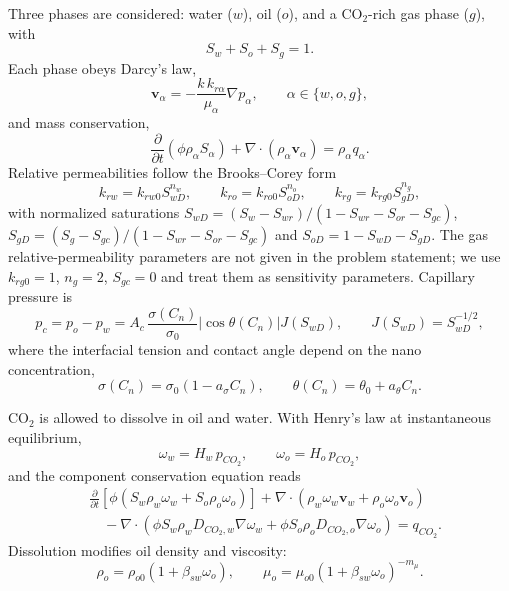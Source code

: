 Three phases are considered: water ($w$), oil ($o$), and a CO$_2$-rich gas
phase ($g$), with
\begin{equation}
S_w+S_o+S_g=1 .
\label{eq:saturation}
\end{equation}
Each phase obeys Darcy's law,
\begin{equation}
\mathbf v_\alpha=-\frac{k\,k_{r\alpha}}{\mu_\alpha}\nabla p_\alpha,
\qquad \alpha\in\{w,o,g\},
\label{eq:darcy}
\end{equation}
and mass conservation,
\begin{equation}
\frac{\partial}{\partial t}\left(\phi\rho_\alpha S_\alpha\right)
+\nabla\cdot\left(\rho_\alpha\mathbf v_\alpha\right)
=\rho_\alpha q_\alpha .
\label{eq:mass}
\end{equation}
Relative permeabilities follow the Brooks--Corey form
\begin{equation}
k_{rw}=k_{rw0}S_{wD}^{n_w},\qquad
k_{ro}=k_{ro0}S_{oD}^{n_o},\qquad
k_{rg}=k_{rg0}S_{gD}^{n_g},
\label{eq:kr}
\end{equation}
with normalized saturations $S_{wD}=(S_w-S_{wr})/(1-S_{wr}-S_{or}-S_{gc})$,
$S_{gD}=(S_g-S_{gc})/(1-S_{wr}-S_{or}-S_{gc})$ and
$S_{oD}=1-S_{wD}-S_{gD}$. The gas relative-permeability parameters are not
given in the problem statement; we use $k_{rg0}=1$, $n_g=2$, $S_{gc}=0$ and
treat them as sensitivity parameters. Capillary pressure is
\begin{equation}
p_c=p_o-p_w=A_c\,\frac{\sigma(C_n)}{\sigma_0}
\left|\cos\theta(C_n)\right|J(S_{wD}),
\qquad J(S_{wD})=S_{wD}^{-1/2},
\label{eq:pc}
\end{equation}
where the interfacial tension and contact angle depend on the nano
concentration,
\begin{equation}
\sigma(C_n)=\sigma_0\left(1-a_\sigma C_n\right),\qquad
\theta(C_n)=\theta_0+a_\theta C_n .
\label{eq:nano_props}
\end{equation}

CO$_2$ is allowed to dissolve in oil and water. With Henry's law at
instantaneous equilibrium,
\begin{equation}
\omega_w=H_w\,p_{CO_2},\qquad \omega_o=H_o\,p_{CO_2},
\label{eq:henry}
\end{equation}
and the component conservation equation reads
\begin{equation}
\begin{aligned}
&\frac{\partial}{\partial t}\left[\phi\left(S_w\rho_w\omega_w
+S_o\rho_o\omega_o\right)\right]
+\nabla\cdot\left(\rho_w\omega_w\mathbf v_w
+\rho_o\omega_o\mathbf v_o\right)\\
&\quad-\nabla\cdot\left(\phi S_w\rho_wD_{CO_2,w}\nabla\omega_w
+\phi S_o\rho_oD_{CO_2,o}\nabla\omega_o\right)=q_{CO_2}.
\end{aligned}
\label{eq:co2}
\end{equation}
Dissolution modifies oil density and viscosity:
\begin{equation}
\rho_o=\rho_{o0}\left(1+\beta_{sw}\omega_o\right),\qquad
\mu_o=\mu_{o0}\left(1+\beta_{sw}\omega_o\right)^{-m_\mu}.
\label{eq:swell}
\end{equation}

